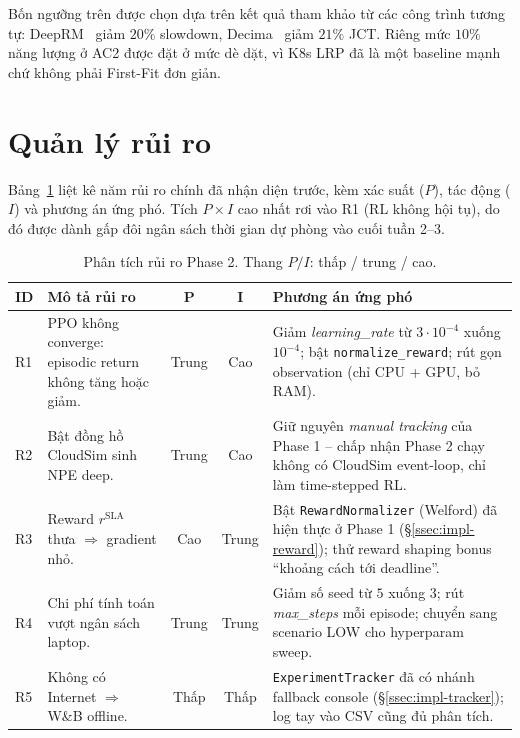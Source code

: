 Bốn ngưỡng trên được chọn dựa trên kết quả tham khảo từ các công
trình tương tự: DeepRM~\cite{mao2016resource} giảm $20\%$ slowdown,
Decima~\cite{decima2019} giảm $21\%$ JCT. Riêng mức $10\%$ năng
lượng ở AC2 được đặt ở mức dè dặt, vì K8s LRP đã là một baseline
mạnh chứ không phải First-Fit đơn giản.

\section{Quản lý rủi ro}
\label{sec:p2-risks}

Bảng~\ref{tab:p2-risks} liệt kê năm rủi ro chính đã nhận diện trước,
kèm xác suất ($P$), tác động ($I$) và phương án ứng phó. Tích
$P \times I$ cao nhất rơi vào R1 (RL không hội tụ), do đó được dành
gấp đôi ngân sách thời gian dự phòng vào cuối tuần 2--3.

\begin{table}[H]
  \centering
  \caption{Phân tích rủi ro Phase 2. Thang $P/I$: thấp / trung / cao.}
  \label{tab:p2-risks}
  \footnotesize
  \begin{tabularx}{\linewidth}{l X c c X}
    \toprule
    \textbf{ID} & \textbf{Mô tả rủi ro} & \textbf{P} & \textbf{I}
                & \textbf{Phương án ứng phó} \\
    \midrule
    R1 & PPO không converge: episodic return không tăng hoặc giảm.
       & Trung & Cao
       & Giảm \textit{learning\_rate} từ $3\cdot 10^{-4}$ xuống
         $10^{-4}$; bật \texttt{normalize\_reward}; rút gọn observation
         (chỉ CPU + GPU, bỏ RAM). \\
    R2 & Bật đồng hồ CloudSim sinh NPE deep.
       & Trung & Cao
       & Giữ nguyên \textit{manual tracking} của Phase 1 -- chấp nhận
         Phase 2 chạy không có CloudSim event-loop, chỉ làm time-stepped
         RL. \\
    R3 & Reward $r^{\mathrm{SLA}}$ thưa $\Rightarrow$ gradient nhỏ.
       & Cao  & Trung
       & Bật \texttt{RewardNormalizer} (Welford) đã hiện thực ở Phase 1
         (§\ref{ssec:impl-reward}); thử reward shaping bonus
         ``khoảng cách tới deadline''. \\
    R4 & Chi phí tính toán vượt ngân sách laptop.
       & Trung & Trung
       & Giảm số seed từ $5$ xuống $3$; rút \emph{max\_steps} mỗi
         episode; chuyển sang scenario LOW cho hyperparam sweep. \\
    R5 & Không có Internet $\Rightarrow$ W\&B offline.
       & Thấp & Thấp
       & \texttt{ExperimentTracker} đã có nhánh fallback console
         (§\ref{ssec:impl-tracker}); log tay vào CSV cũng đủ phân tích. \\
    \bottomrule
  \end{tabularx}
\end{table}

